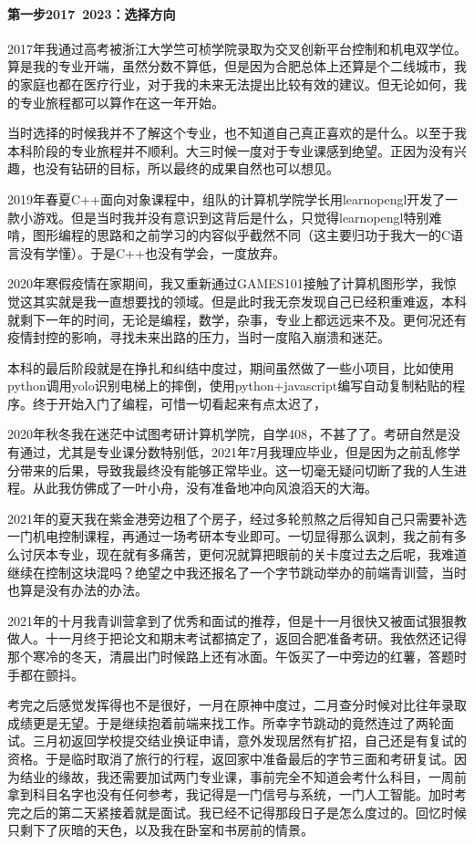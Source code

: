 \paragraph{第一步2017~2023：选择方向}

2017年我通过高考被浙江大学竺可桢学院录取为交叉创新平台控制和机电双学位。算是我的专业开端，虽然分数不算低，但是因为合肥总体上还算是个二线城市，我的家庭也都在医疗行业，对于我的未来无法提出比较有效的建议。但无论如何，我的专业旅程都可以算作在这一年开始。

当时选择的时候我并不了解这个专业，也不知道自己真正喜欢的是什么。以至于我本科阶段的专业旅程并不顺利。大三时候一度对于专业课感到绝望。正因为没有兴趣，也没有钻研的目标，所以最终的成果自然也可以想见。

2019年春夏C++面向对象课程中，组队的计算机学院学长用learnopengl开发了一款小游戏。但是当时我并没有意识到这背后是什么，只觉得learnopengl特别难啃，图形编程的思路和之前学习的内容似乎截然不同（这主要归功于我大一的C语言没有学懂）。于是C++也没有学会，一度放弃。

2020年寒假疫情在家期间，我又重新通过GAMES101接触了计算机图形学，我惊觉这其实就是我一直想要找的领域。但是此时我无奈发现自己已经积重难返，本科就剩下一年的时间，无论是编程，数学，杂事，专业上都远远来不及。更何况还有疫情封控的影响，寻找未来出路的压力，当时一度陷入崩溃和迷茫。

本科的最后阶段就是在挣扎和纠结中度过，期间虽然做了一些小项目，比如使用python调用yolo识别电梯上的摔倒，使用python+javascript编写自动复制粘贴的程序。终于开始入门了编程，可惜一切看起来有点太迟了，

2020年秋冬我在迷茫中试图考研计算机学院，自学408，不甚了了。考研自然是没有通过，尤其是专业课分数特别低，2021年7月我理应毕业，但是因为之前乱修学分带来的后果，导致我最终没有能够正常毕业。这一切毫无疑问切断了我的人生进程。从此我仿佛成了一叶小舟，没有准备地冲向风浪滔天的大海。

2021年的夏天我在紫金港旁边租了个房子，经过多轮煎熬之后得知自己只需要补选一门机电控制课程，再通过一场考研本专业即可。一切显得那么讽刺，我之前有多么讨厌本专业，现在就有多痛苦，更何况就算把眼前的关卡度过去之后呢，我难道继续在控制这块混吗？绝望之中我还报名了一个字节跳动举办的前端青训营，当时也算是没有办法的办法。

2021年的十月我青训营拿到了优秀和面试的推荐，但是十一月很快又被面试狠狠教做人。十一月终于把论文和期末考试都搞定了，返回合肥准备考研。我依然还记得那个寒冷的冬天，清晨出门时候路上还有冰面。午饭买了一中旁边的红薯，答题时手都在颤抖。

考完之后感觉发挥得也不是很好，一月在原神中度过，二月查分时候对比往年录取成绩更是无望。于是继续抱着前端来找工作。所幸字节跳动的竟然连过了两轮面试。三月初返回学校提交结业换证申请，意外发现居然有扩招，自己还是有复试的资格。于是临时取消了旅行的行程，返回家中准备最后的字节三面和考研复试。因为结业的缘故，我还需要加试两门专业课，事前完全不知道会考什么科目，一周前拿到科目名字也没有任何参考，我记得是一门信号与系统，一门人工智能。加时考完之后的第二天紧接着就是面试。我已经不记得那段日子是怎么度过的。回忆时候只剩下了灰暗的天色，以及我在卧室和书房前的情景。

